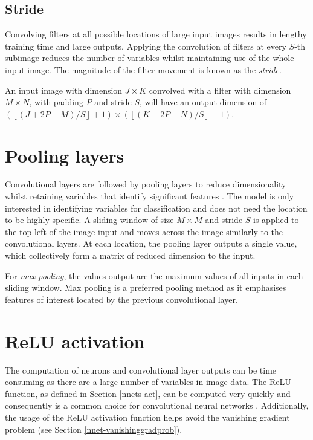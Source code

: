\subsection*{Stride}\label{convnets-stride}

Convolving filters at all possible locations of large input images results in lengthy training time and large outputs. Applying the convolution of filters at every $S$-th subimage reduces the number of variables whilst maintaining use of the whole input image. The magnitude of the filter movement is known as the \textit{stride}.

An input image with dimension $J \times K$ convolved with a filter with dimension $M \times N$, with padding $P$ and stride $S$, will have an output dimension of $\left(\left\lfloor (J + 2P - M)/S\right\rfloor + 1\right) \times \left(\left\lfloor (K + 2P - N)/S \right\rfloor + 1\right)$.

\section{Pooling layers}\label{convnets-pool}

Convolutional layers are followed by pooling layers to reduce dimensionality whilst retaining variables that identify significant features \citep{ADeshpande2016}. The model is only interested in identifying variables for classification and does not need the location to be highly specific. A sliding window of size $M\times M$ and stride $S$ is applied to the top-left of the image input and moves across the image similarly to the convolutional layers. At each location, the pooling layer outputs a single value, which collectively form a matrix of reduced dimension to the input.

For \textit{max pooling}, the values output are the maximum values of all inputs in each sliding window. Max pooling is a preferred pooling method as it emphasises features of interest located by the previous convolutional layer.

\section{ReLU activation}\label{convnets-act}

The computation of neurons and convolutional layer outputs can be time consuming as there are a large number of variables in image data. The ReLU function, as defined in Section \ref{nnets-act}, can be computed very quickly and consequently is a common choice for convolutional neural networks \citep{ADeshpande2016}. Additionally, the usage of the ReLU activation function helps avoid the vanishing gradient problem (see Section \ref{nnet-vanishinggradprob}).


